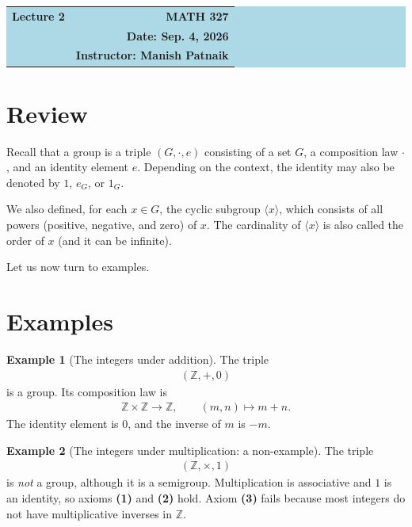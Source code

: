 \documentclass[reqno,11pt]{amsart}
\theoremstyle{definition}
\newtheorem{example}{Example}[section]
\theoremstyle{plain}
\theoremstyle{remark}
\numberwithin{equation}{section}
\newcommand{\Z}{\mathbb{Z}}
\newcommand{\be}{\begin{eqnarray}}
\newcommand{\ee}{\end{eqnarray}}
\begin{document}
\begin{center}
  \colorbox{lightblue}{%
    \begin{minipage}{0.94\textwidth}
      \vspace{0.55em}
      \begin{tabular*}{\textwidth}{@{\extracolsep{\fill}}lr}
        {\color{courseblue}\bfseries\LARGE Lecture 2} &
        {\color{courseblue}\bfseries\LARGE MATH 327}\\[0.35em]
         & \textbf{Date: Sep. 4, 2026}\\
        & \textbf{Instructor: Manish Patnaik}
      \end{tabular*}
      \vspace{0.45em}
    \end{minipage}}
\end{center}

\par

\setcounter{tocdepth}{1}
\tableofcontents

\section{Review }

Recall that a group is a triple $(G,\cdot,e)$ consisting of a set $G$, a
composition law $\cdot$, and an identity element $e$. Depending on the
context, the identity may also be denoted by $1$, $e_G$, or $1_G$.

We also defined, for each $x\in G$, the cyclic subgroup $\langle x\rangle$,
which consists of all powers (positive, negative, and zero) of $x$. The
cardinality of $\langle x\rangle$ is also called the order of $x$ (and it can
be infinite).

Let us now turn to examples.


\section{Examples}

\begin{example}[The integers under addition]
The triple
\be
(\Z,+,0)
\ee
 is a group. Its composition law is
\be
\Z\times\Z\longrightarrow\Z,
  \qquad (m,n)\longmapsto m+n.
\ee
The identity element is $0$, and the inverse of $m$ is $-m$.
\end{example}

\begin{example}[The integers under multiplication: a non-example]
The triple
\be
(\Z,\times,1)
\ee
is \emph{not} a group, although it is a semigroup. Multiplication is
associative and $1$ is an identity, so axioms \textbf{(1)} and \textbf{(2)}
hold. Axiom \textbf{(3)} fails because most integers do not have
multiplicative inverses in $\Z$.
\end{example}
\end{document}

